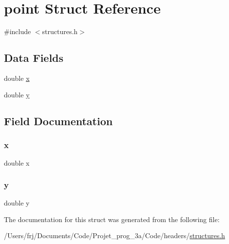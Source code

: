 \hypertarget{structpoint}{}\section{point Struct Reference}
\label{structpoint}


{\ttfamily \#include $<$structures.\+h$>$}

\subsection*{Data Fields}
\begin{DoxyCompactItemize}
\item 
double \hyperlink{structpoint_af88b946fb90d5f08b5fb740c70e98c10}{x}
\item 
double \hyperlink{structpoint_ab927965981178aa1fba979a37168db2a}{y}
\end{DoxyCompactItemize}


\subsection{Field Documentation}
\hypertarget{structpoint_af88b946fb90d5f08b5fb740c70e98c10}{}\label{structpoint_af88b946fb90d5f08b5fb740c70e98c10} 
\subsubsection{\texorpdfstring{x}{x}}
{\footnotesize\ttfamily double x}

\hypertarget{structpoint_ab927965981178aa1fba979a37168db2a}{}\label{structpoint_ab927965981178aa1fba979a37168db2a} 
\subsubsection{\texorpdfstring{y}{y}}
{\footnotesize\ttfamily double y}



The documentation for this struct was generated from the following file\+:\begin{DoxyCompactItemize}
\item 
/\+Users/frj/\+Documents/\+Code/\+Projet\+\_\+prog\+\_\+3a/\+Code/headers/\hyperlink{structures_8h}{structures.\+h}\end{DoxyCompactItemize}
